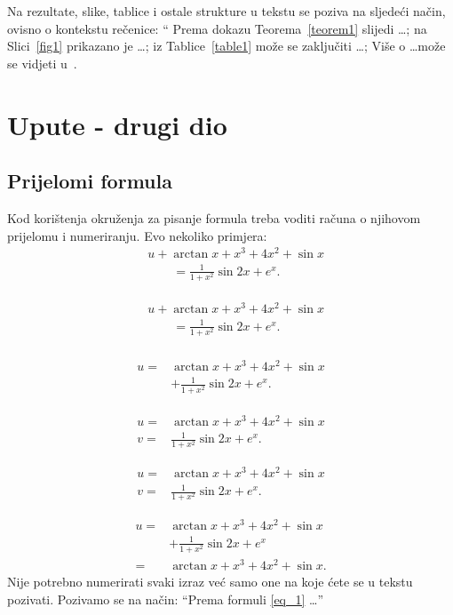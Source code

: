 \documentclass{mathos}
\begin{document}
\noindent
Na rezultate, slike, tablice i ostale strukture u tekstu se poziva na sljedeći način, ovisno o kontekstu rečenice: `` Prema dokazu Teorema~\ref{teorem1} slijedi \dots; na
Slici~\ref{fig1} prikazano je \dots; iz Tablice~\ref{table1} može se zaključiti \dots; Više o \dots može se vidjeti u~\cite{JunBae}.



\chapter{Upute - drugi dio}\label{poglavlje_2}

\section{Prijelomi formula}
Kod korištenja okruženja za pisanje formula treba voditi računa o njihovom prijelomu i numeriranju. Evo nekoliko primjera:
\begin{align*}
    &u+\arctan x +x^3+4x^2+\sin{x}  \\
    &\qquad =\frac{1}{1 + x^2} \sin{2x}+e^x.
\end{align*}

\begin{eqnarray}\label{eq_1}
\begin{aligned}
    &u+\arctan x +x^3+4x^2+\sin{x}  \\
    &\qquad =\frac{1}{1 + x^2} \sin{2x}+e^x.
\end{aligned}
\end{eqnarray}

\begin{eqnarray}
\begin{aligned}
    u=&\arctan x +x^3+4x^2+\sin{x}  \\
    &+\frac{1}{1 + x^2} \sin{2x}+e^x.
\end{aligned}
\end{eqnarray}

\begin{align*}
    u=&\arctan x +x^3+4x^2+\sin{x}  \\
    v=&\frac{1}{1 + x^2} \sin{2x}+e^x.\label{eef}
\end{align*}

\begin{align}
    u=&\arctan x +x^3+4x^2+\sin{x}  \\
    v=&\frac{1}{1 + x^2} \sin{2x}+e^x.\label{eef}
\end{align}

\begin{align*}
    u=&\arctan x +x^3+4x^2+\sin{x}  \\
    &+\frac{1}{1 + x^2} \sin{2x}+e^x\\
    =&\arctan x +x^3+4x^2+\sin{x}.
\end{align*}
Nije potrebno numerirati svaki izraz već samo one na koje ćete se u tekstu pozivati. Pozivamo se na način: ``Prema formuli \eqref{eq_1} \dots''
\end{document}
